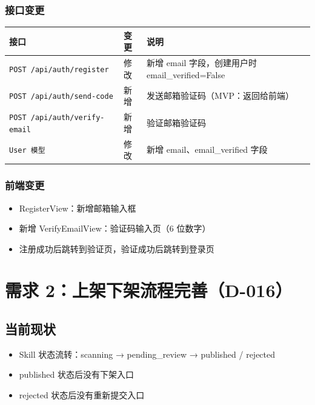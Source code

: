 \documentclass[11pt,a4paper]{article}
\begin{document}
\subsubsection{接口变更}

\begin{table}[h]
\centering
\begin{tabularx}{\linewidth}{llX}
\toprule
\textbf{接口} & \textbf{变更} & \textbf{说明} \\
\midrule
\texttt{POST /api/auth/register} & 修改 & 新增 email 字段，创建用户时 email\_verified=False \\
\texttt{POST /api/auth/send-code} & 新增 & 发送邮箱验证码（MVP：返回给前端） \\
\texttt{POST /api/auth/verify-email} & 新增 & 验证邮箱验证码 \\
\texttt{User 模型} & 修改 & 新增 email、email\_verified 字段 \\
\bottomrule
\end{tabularx}
\end{table}

\subsubsection{前端变更}

\begin{itemize}[nosep]
  \item RegisterView：新增邮箱输入框
  \item 新增 VerifyEmailView：验证码输入页（6 位数字）
  \item 注册成功后跳转到验证页，验证成功后跳转到登录页
\end{itemize}

\section{需求 2：上架下架流程完善（D-016）}

\subsection{当前现状}

\begin{itemize}[nosep]
  \item Skill 状态流转：scanning → pending\_review → published / rejected
  \item published 状态后没有下架入口
  \item rejected 状态后没有重新提交入口
\end{itemize}
\end{document}
